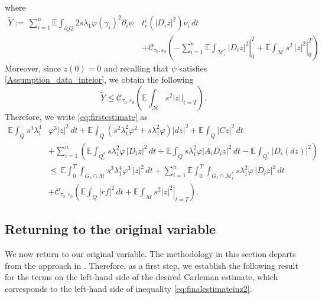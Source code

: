 \documentclass[11pt,oneside,leqno]{amsart}
\numberwithin{equation}{section}
\numberwithin{equation}{section}
\newcommand{\E}{\mathbb{E}}
\begin{document}
where
\begin{equation}\label{eq:valueboundary}
    \begin{split}
        \tilde{Y}:= \,\sum_{i=1}^{n}\E\int_{\partial_i Q }2s\lambda_{1} \varphi (\gamma_i)^2\partial_i\psi\,& t_r^i(|D_iz|^2)\nu_i\,dt\\
        &+\mathcal{C}_{\tau_{0},\varepsilon_0}\left(\left.-\sum_{i=1}^{n}\E\int_{\mathcal{M}_i^{\ast}}|D_iz|^2\right|_0^T+\left.\E\int_{\mathcal{M}}s^2\,|z|^2\right|_0^T\right)
    \end{split}
\end{equation}
{ 
Moreover, since $z(0)=0$ and recalling that $\psi$ satisfies \eqref{Assumption_data_inteior}, we obtain the following
\begin{equation*}
    \tilde{Y}\leq \mathcal{C}_{\tau_0,\varepsilon_0}\left(\E\int_{\mathcal{M}}s^2|z|\bigg|_{t=T}\right).
\end{equation*}
Therefore, we write \eqref{eq:firstestimate} as
\begin{equation}\label{eq:finalestimateinz2}
\begin{split}  
\E\int_{Q} s^{3}\lambda^{4}_{1}&\varphi^{3}|z|^{2}\,dt+\E\int_{Q}(s^2\lambda_{1}^2\varphi^2+s\lambda_{1}^2\varphi)|dz|^2+\E\int_{Q}|Cz|^2\,dt\\
&+\sum_{i=1}^{n}\left(\E\int_{Q_{i}^{\ast}}s\lambda^{2}_{1}\varphi\,|D_{i}z|^{2}\,dt+\E\int_{Q} s\lambda_{1}^2\varphi|A_iD_iz|^2\,dt-\E\int_{Q_i^{\ast}}|D_i(dz)|^2\right)\\
&\leq\,\E\int_{0}^T\int_{G_{1}\cap \mathcal{M}}s^{3}\lambda^{4}_{1}\varphi^{3}\,|z|^{2}\,dt+ \sum_{i=1}^{n}\E\int_0^T\int_{G_{1}\cap\mathcal{M}_{i}^{\ast}}s\lambda^{2}_{1}\varphi\,|D_{i}z|^{2}\,dt\\
&+\mathcal{C}_{\tau_{0},\varepsilon_0}\left(\E\int_{Q}|rf|^2\,dt+\left.\E\int_{\mathcal{M}}s^2|z|^2\right|_{t=T}\right).
\end{split}
\end{equation}
}

\subsection{Returning to the original variable}\label{sec:returninbackvarible}

We now return to our original variable. The methodology in this section departs from the approach in \cite{LPP:2025}. Therefore, as a first step, we establish the following result for the terms on the left-hand side of the desired Carleman estimate, which corresponds to the left-hand side of inequality \eqref{eq:finalestimateinz2}.
\end{document}
